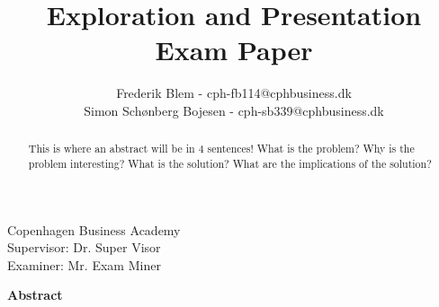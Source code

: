 \documentclass[
english, %
headsepline, %
]{scrartcl} %
\begin{document}
\begin{titlepage}
\title{Exploration and Presentation Exam Paper}
\author{Frederik Blem - cph-fb114@cphbusiness.dk\\
Simon Schønberg Bojesen - cph-sb339@cphbusiness.dk}
\subtitle{}
\maketitle
\begin{center}
    \large
        Copenhagen Business Academy\\
        Supervisor: Dr. Super Visor\\
        Examiner: Mr. Exam Miner
\end{center}

\thispagestyle{empty}

\end{titlepage}
\clearpage

\Large
    \textbf{Abstract}
    \begin{abstract}
        \label{sec:abstract}
        This is where an abstract will be in 4 sentences! What is the problem? Why is the problem interesting? What is the solution? 
        What are the implications of the solution?
    \end{abstract}
\normalsize  
\clearpage

\tableofcontents %

\listoffigures %

\listoftables %
\clearpage




\end{document}
